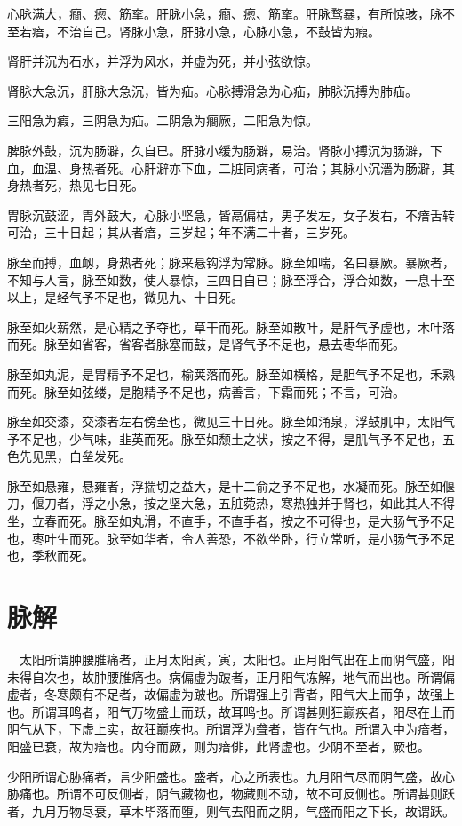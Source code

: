 \documentclass{article}%
\begin{document}
心脉满大，癎、瘛、筋挛。肝脉小急，癎、瘛、筋挛。肝脉骛暴，有所惊骇，脉不至若瘖，不治自己。肾脉小急，肝脉小急，心脉小急，不鼓皆为瘕。

肾肝并沉为石水，并浮为风水，并虚为死，并小弦欲惊。

肾脉大急沉，肝脉大急沉，皆为疝。心脉搏滑急为心疝，肺脉沉搏为肺疝。

三阳急为瘕，三阴急为疝。二阴急为癎厥，二阳急为惊。

脾脉外鼓，沉为肠澼，久自已。肝脉小缓为肠澼，易治。肾脉小搏沉为肠澼，下血，血温、身热者死。心肝澼亦下血，二脏同病者，可治；其脉小沉濇为肠澼，其身热者死，热见七日死。

胃脉沉鼓涩，胃外鼓大，心脉小坚急，皆鬲偏枯，男子发左，女子发右，不瘖舌转可治，三十日起；其从者瘖，三岁起；年不满二十者，三岁死。

脉至而搏，血衂，身热者死；脉来悬钩浮为常脉。脉至如喘，名曰暴厥。暴厥者，不知与人言，脉至如数，使人暴惊，三四日自已；脉至浮合，浮合如数，一息十至以上，是经气予不足也，微见九、十日死。

脉至如火薪然，是心精之予夺也，草干而死。脉至如散叶，是肝气予虚也，木叶落而死。脉至如省客，省客者脉塞而鼓，是肾气予不足也，悬去枣华而死。

脉至如丸泥，是胃精予不足也，榆荚落而死。脉至如横格，是胆气予不足也，禾熟而死。脉至如弦缕，是胞精予不足也，病善言，下霜而死；不言，可治。

脉至如交漆，交漆者左右傍至也，微见三十日死。脉至如涌泉，浮鼓肌中，太阳气予不足也，少气味，韭英而死。脉至如颓土之状，按之不得，是肌气予不足也，五色先见黑，白垒发死。

脉至如悬雍，悬雍者，浮揣切之益大，是十二俞之予不足也，水凝而死。脉至如偃刀，偃刀者，浮之小急，按之坚大急，五脏菀热，寒热独并于肾也，如此其人不得坐，立春而死。脉至如丸滑，不直手，不直手者，按之不可得也，是大肠气予不足也，枣叶生而死。脉至如华者，令人善恐，不欲坐卧，行立常听，是小肠气予不足也，季秋而死。
\section{脉解}
　太阳所谓肿腰脽痛者，正月太阳寅，寅，太阳也。正月阳气出在上而阴气盛，阳未得自次也，故肿腰脽痛也。病偏虚为跛者，正月阳气冻解，地气而出也。所谓偏虚者，冬寒颇有不足者，故偏虚为跛也。所谓强上引背者，阳气大上而争，故强上也。所谓耳鸣者，阳气万物盛上而跃，故耳鸣也。所谓甚则狂巅疾者，阳尽在上而阴气从下，下虚上实，故狂巅疾也。所谓浮为聋者，皆在气也。所谓入中为瘖者，阳盛已衰，故为瘖也。内夺而厥，则为瘖俳，此肾虚也。少阴不至者，厥也。

少阳所谓心胁痛者，言少阳盛也。盛者，心之所表也。九月阳气尽而阴气盛，故心胁痛也。所谓不可反侧者，阴气藏物也，物藏则不动，故不可反侧也。所谓甚则跃者，九月万物尽衰，草木毕落而堕，则气去阳而之阴，气盛而阳之下长，故谓跃。
\end{document}
